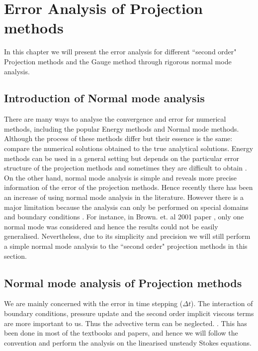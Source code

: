 \chapter{Error Analysis of Projection methods}
\label{chapter 4}
In this chapter we will present the error analysis for different ``second order" Projection methods and the Gauge method through rigorous normal mode analysis.

\section{Introduction of Normal mode analysis}

There are many ways to analyse the convergence and error for numerical methods, including the popular Energy methods \cite{liu1996projection,guermond2006overview} and Normal mode methods. Although the process of these methods differ but their essence is the same: compare the numerical solutions obtained to the true analytical solutions\cite{pyo2005normal,guermond2004error}. Energy methods can be used in a general setting but depends on the particular error structure of the projection methods and sometimes they are difficult to obtain \cite{guermond2006overview}. On the other hand, normal mode analysis is simple and reveals more precise information of the error of the projection methods. Hence recently there has been an increase of using normal mode analysis in the literature. However there is a major limitation because the analysis can only be performed on special domains and boundary conditions \cite{strikwerda1999accuracy,pyo2005normal,brown2001accurate}. For instance, in Brown. et. al 2001 paper \cite{brown2001accurate}, only one normal mode was considered and hence the results could not be easily generalised. Nevertheless, due to its simplicity and precision we will still perform a simple normal mode analysis to the ``second order" projection methods in this section.

\section{Normal mode analysis of Projection methods}
We are mainly concerned with the error in time stepping ($\Delta t$). The interaction of boundary conditions, pressure update and the second order implicit viscous terms are more important to us. Thus the advective term can be neglected. \cite{brown2001accurate,strikwerda1999accuracy,pyo2005normal,guermond2004error,liu1996projection,shen1996error,shen1992error}. This has been done in most of the textbooks and papers, and hence we will follow the convention and perform the analysis on the linearised unsteady Stokes equations.\\

